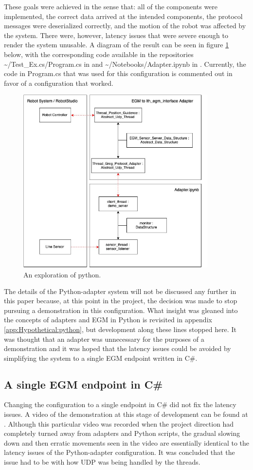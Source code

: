 \documentclass{cslthse-msc}
\begin{document}
These goals were achieved in the sense that: all of the components were implemented, the correct data arrived at the intended components, the protocol messages were deserialized correctly, and the motion of the robot was affected by the system. There were, however, latency issues that were severe enough to render the system unusable. A diagram of the result can be seen in figure \ref{fig:python_adapter} below, with the corresponding code available in the repositories  \textasciitilde/Test\_Ex.cs/Program.cs in \cite{Greg:LTH_EGM} and \textasciitilde/Notebooks/Adapter.ipynb in \cite{Greg:Jupyter}. Currently, the code in Program.cs that was used for this configuration is commented out in favor of a configuration that worked. 

\begin{figure}[H]
    \centering
    \includegraphics[width=10cm]{python_adapter.jpg}
    \caption{An exploration of python.}
    \label{fig:python_adapter}
\end{figure}
The details of the Python-adapter system will not be discussed any further in this paper because, at this point in the project, the decision was made to stop pursuing a demonstration in this configuration. What insight was gleaned into the concepts of adapters and EGM in Python is revisited in appendix \ref{app:Hypothetical:python}, but development along these lines stopped here. It was thought that an adapter was unnecessary for the purposes of a demonstration and it was hoped that the latency issues could be avoided by simplifying the system to a single EGM endpoint written in C\#. 

\subsection{A single EGM endpoint in C\#}
\label{sec:Dev:I2:one_endpoint}
Changing the configuration to a single endpoint in C\# did not fix the latency issues. A video of the demonstration at this stage of development can be found at \cite{Greg:Bad_Demo}. Although this particular video was recorded when the project direction had completely turned away from adapters and Python scripts, the gradual slowing down and then erratic movements seen in the video are essentially identical to the latency issues of the Python-adapter configuration. It was concluded that the issue had to be with how UDP was being handled by the threads.
\end{document}
